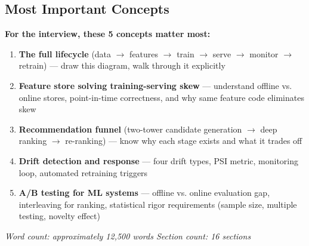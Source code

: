 \documentclass[11pt]{article}
\begin{document}
\subsection{Most Important Concepts}\label{most-important-concepts}

\textbf{For the interview, these 5 concepts matter most:}

\begin{enumerate}
\def\labelenumi{\arabic{enumi}.}
\item
  \textbf{The full lifecycle} (data \(\rightarrow\) features \(\rightarrow\) train \(\rightarrow\) serve \(\rightarrow\) monitor \(\rightarrow\) retrain) --- draw this diagram, walk through it explicitly
\item
  \textbf{Feature store solving training-serving skew} --- understand offline vs. online stores, point-in-time correctness, and why same feature code eliminates skew
\item
  \textbf{Recommendation funnel} (two-tower candidate generation \(\rightarrow\) deep ranking \(\rightarrow\) re-ranking) --- know why each stage exists and what it trades off
\item
  \textbf{Drift detection and response} --- four drift types, PSI metric, monitoring loop, automated retraining triggers
\item
  \textbf{A/B testing for ML systems} --- offline vs. online evaluation gap, interleaving for ranking, statistical rigor requirements (sample size, multiple testing, novelty effect)
\end{enumerate}

\emph{Word count: approximately 12,500 words \textbar{} Section count: 16 sections}
\end{document}
